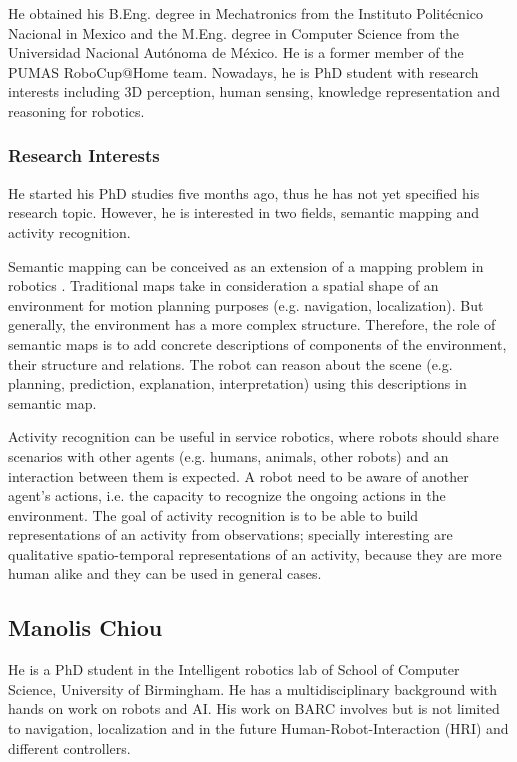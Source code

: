 \documentclass[conference]{IEEEtran}
\begin{document}
He obtained his B.Eng. degree in Mechatronics from the Instituto Politécnico Nacional in Mexico and the M.Eng. degree in Computer Science from the Universidad Nacional Autónoma de México. He is a former member of the PUMAS RoboCup@Home team. Nowadays, he is PhD student with research interests including 3D perception, human sensing, knowledge representation and reasoning for robotics.

\subsubsection*{Research Interests}

He started his PhD studies five months ago, thus he has not yet specified his research topic. However, he is interested in two fields, semantic mapping and activity recognition.

Semantic mapping can be conceived as an extension of a mapping problem in robotics \cite{Nuchter08_TowardsSemanticMaps}. Traditional maps take in consideration a spatial shape of an environment for motion planning purposes (e.g. navigation, localization). But generally, the environment has a more complex structure. Therefore, the role of semantic maps is to add concrete descriptions of components of the environment, their structure and relations. The robot can reason about the scene (e.g. planning, prediction, explanation, interpretation) using this descriptions in semantic map.

Activity recognition can be useful in service robotics, where robots should share scenarios with other agents (e.g. humans, animals, other robots) and an interaction between them is expected. A robot need to be aware of another agent's actions, i.e. the capacity to recognize the ongoing actions in the environment. 
The goal of activity recognition is to be able to build representations of an activity from observations; specially interesting are qualitative spatio-temporal representations of an activity, because they are more human alike and they can be used in general cases.

\subsection{Manolis Chiou}

He is a PhD student in the Intelligent robotics lab of School of Computer Science, University of Birmingham. He has a multidisciplinary background with hands on work on robots and AI. His work on BARC involves but is not limited to navigation, localization and in the future Human-Robot-Interaction (HRI) and different controllers.
\end{document}
